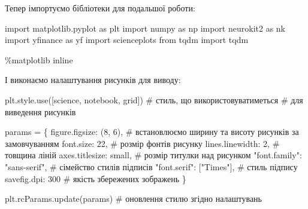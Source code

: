\documentclass[
  letterpaper,
]{report}
\newenvironment{Shaded}{\begin{snugshade}}{\end{snugshade}}
\newcommand{\CommentTok}[1]{\textcolor[rgb]{0.37,0.37,0.37}{#1}}
\newcommand{\DecValTok}[1]{\textcolor[rgb]{0.68,0.00,0.00}{#1}}
\newcommand{\ImportTok}[1]{\textcolor[rgb]{0.00,0.46,0.62}{#1}}
\newcommand{\NormalTok}[1]{\textcolor[rgb]{0.00,0.23,0.31}{#1}}
\newcommand{\OperatorTok}[1]{\textcolor[rgb]{0.37,0.37,0.37}{#1}}
\newcommand{\StringTok}[1]{\textcolor[rgb]{0.13,0.47,0.30}{#1}}
\begin{document}
Тепер імпортуємо бібліотеки для подальшої роботи:

\begin{Shaded}
\begin{Highlighting}[]
\ImportTok{import}\NormalTok{ matplotlib.pyplot }\ImportTok{as}\NormalTok{ plt }
\ImportTok{import}\NormalTok{ numpy }\ImportTok{as}\NormalTok{ np}
\ImportTok{import}\NormalTok{ neurokit2 }\ImportTok{as}\NormalTok{ nk}
\ImportTok{import}\NormalTok{ yfinance }\ImportTok{as}\NormalTok{ yf}
\ImportTok{import}\NormalTok{ scienceplots}
\ImportTok{from}\NormalTok{ tqdm }\ImportTok{import}\NormalTok{ tqdm}

\OperatorTok{\%}\NormalTok{matplotlib inline}
\end{Highlighting}
\end{Shaded}

І виконаємо налаштування рисунків для виводу:

\begin{Shaded}
\begin{Highlighting}[]
\NormalTok{plt.style.use([}\StringTok{\textquotesingle{}science\textquotesingle{}}\NormalTok{, }\StringTok{\textquotesingle{}notebook\textquotesingle{}}\NormalTok{, }\StringTok{\textquotesingle{}grid\textquotesingle{}}\NormalTok{]) }\CommentTok{\# стиль, що використовуватиметься}
                                               \CommentTok{\# для виведення рисунків}

\NormalTok{params }\OperatorTok{=}\NormalTok{ \{}
    \StringTok{\textquotesingle{}figure.figsize\textquotesingle{}}\NormalTok{: (}\DecValTok{8}\NormalTok{, }\DecValTok{6}\NormalTok{),         }\CommentTok{\# встановлюємо ширину та висоту рисунків за замовчуванням}
    \StringTok{\textquotesingle{}font.size\textquotesingle{}}\NormalTok{: }\DecValTok{22}\NormalTok{,                  }\CommentTok{\# розмір фонтів рисунку}
    \StringTok{\textquotesingle{}lines.linewidth\textquotesingle{}}\NormalTok{: }\DecValTok{2}\NormalTok{,             }\CommentTok{\# товщина ліній}
    \StringTok{\textquotesingle{}axes.titlesize\textquotesingle{}}\NormalTok{: }\StringTok{\textquotesingle{}small\textquotesingle{}}\NormalTok{,        }\CommentTok{\# розмір титулки над рисунком}
    \StringTok{"font.family"}\NormalTok{: }\StringTok{"sans{-}serif"}\NormalTok{,      }\CommentTok{\# сімейство стилів підписів }
    \StringTok{"font.serif"}\NormalTok{: [}\StringTok{"Times"}\NormalTok{],          }\CommentTok{\# стиль підпису}
    \StringTok{\textquotesingle{}savefig.dpi\textquotesingle{}}\NormalTok{: }\DecValTok{300}                \CommentTok{\# якість збережених зображень}
\NormalTok{\}}

\NormalTok{plt.rcParams.update(params)           }\CommentTok{\# оновлення стилю згідно налаштувань}
\end{Highlighting}
\end{Shaded}
\end{document}

